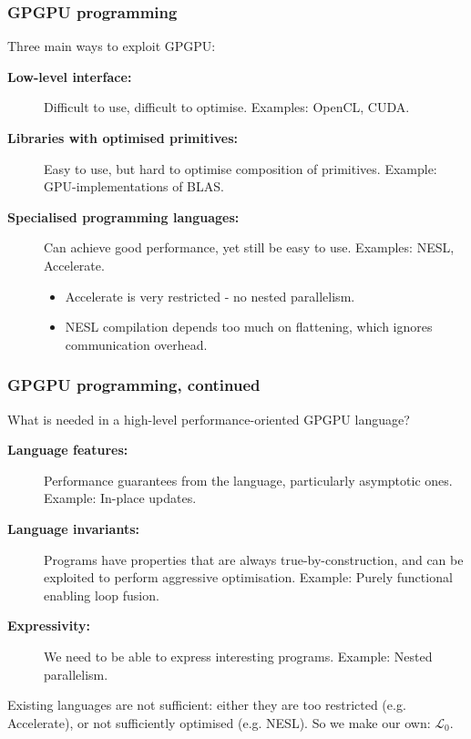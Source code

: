 \documentclass[rgb,dvipsnames]{beamer}
\newcommand{\LO}{$\mathcal{L}_0$}
\begin{document}
\begin{frame}
  \frametitle{GPGPU programming}

  Three main ways to exploit GPGPU:

  \begin{description}
  \item[\bf Low-level interface:] Difficult to use,
    difficult to optimise.  Examples: OpenCL, CUDA.
  \item[\bf Libraries with optimised primitives:] Easy to use, but hard to
    optimise composition of primitives.  Example: GPU-implementations
    of BLAS.
  \item[\bf Specialised programming languages:] Can achieve good
    performance, yet still be easy to use.  Examples: NESL,
    Accelerate.
    \begin{itemize}
    \item Accelerate is very restricted - no nested parallelism.
    \item NESL compilation depends too much on flattening, which
      ignores communication overhead.
    \end{itemize}
  \end{description}
\end{frame}

\begin{frame}
  \frametitle{GPGPU programming, continued}

  What is needed in a high-level performance-oriented GPGPU language?

  \begin{description}
  \item[\bf Language features:] Performance guarantees from the language,
    particularly asymptotic ones.  Example: In-place updates.
  \item[\bf Language invariants:] Programs have properties that are always
    true-by-construction, and can be exploited to perform aggressive
    optimisation.  Example: Purely functional enabling loop fusion.
  \item[\bf Expressivity:] We need to be able to express interesting
    programs.  Example: Nested parallelism.
  \end{description}

  Existing languages are not sufficient: either they are too
  restricted (e.g. Accelerate), or not sufficiently optimised
  (e.g. NESL).  So we make our own: \LO{}.
\end{frame}

\end{document}
